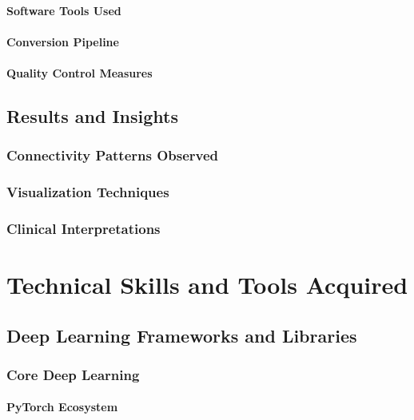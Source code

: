 \documentclass[12pt,a4paper]{report}
\begin{document}
\subsubsection{Software Tools Used}

\subsubsection{Conversion Pipeline}

\subsubsection{Quality Control Measures}

\section{Results and Insights}

\subsection{Connectivity Patterns Observed}

\subsection{Visualization Techniques}

\subsection{Clinical Interpretations}

\chapter{Technical Skills and Tools Acquired}

\section{Deep Learning Frameworks and Libraries}

\subsection{Core Deep Learning}

\subsubsection{PyTorch Ecosystem}
\end{document}
